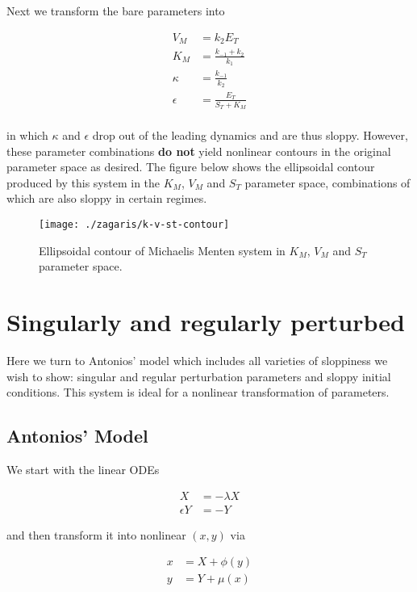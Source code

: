 \documentclass[11pt]{article}
\begin{document}
Next we transform the bare parameters into 

\begin{align*}
  V_M &= k_2 E_T \\
  K_M &= \frac{k_{-1} + k_2}{k_1} \\
  \kappa &= \frac{k_{-1}}{k_2} \\
  \epsilon &= \frac{E_T}{S_T + K_M} \\
\end{align*}

in which $\kappa$ and $\epsilon$ drop out of the leading dynamics and are thus sloppy. However, these parameter combinations \textbf{do not} yield nonlinear contours in the original parameter space as desired. The figure below shows the ellipsoidal contour produced by this system in the $K_M$, $V_M$ and $S_T$ parameter space, combinations of which are also sloppy in certain regimes.

\begin{figure}[htbp]
  \centering
  \texttt{[image: ./zagaris/k-v-st-contour]}
  \caption{Ellipsoidal contour of Michaelis Menten system in $K_M$, $V_M$ and $S_T$ parameter space.}
\end{figure}

\section{Singularly and regularly perturbed}

Here we turn to Antonios' model which includes all varieties of sloppiness we wish to show: singular and regular perturbation parameters and sloppy initial conditions. This system is ideal for a nonlinear transformation of parameters.

\subsection{Antonios' Model}

We start with the linear ODEs

\begin{align*}
  X &= -\lambda X \\
  \epsilon Y &= -Y
\end{align*}

and then transform it into nonlinear $(x, y)$ via 

\begin{align*}
  x &= X + \phi(y) \\
  y &= Y + \mu(x) \\
\end{align*}
\end{document}
